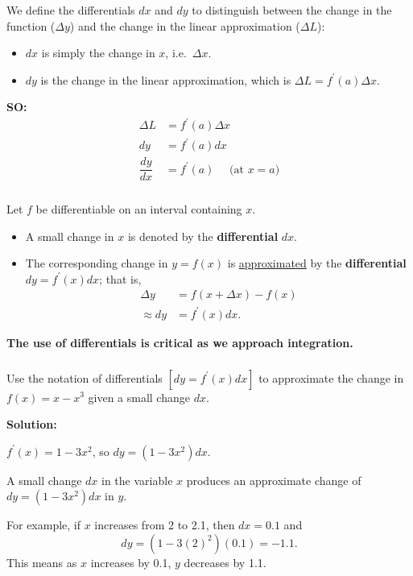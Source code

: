 \documentclass[14pt]{beamer}
\begin{document}
\begin{frame}
\small
We define the differentials $dx$ and $dy$ to distinguish between the \alert{change in the function ($\Delta y$)} and the \alert{change in the linear approximation ($\Delta L$)}: 
\begin{itemize}
\item $dx$ is simply the change in $x$, i.e.\ $\Delta x$.
\item $dy$ is the change in the linear approximation, which is $\Delta L=f^{\prime}(a) \Delta x$.
\end{itemize}

{\bf SO:}
\begin{align*}
\Delta L &= f^{\prime}(a) \Delta x \\[0.5pc]
dy &= f^{\prime}(a) dx \\[0.5pc]
\dfrac{dy}{dx} &= f^{\prime}(a)\quad \text{ (at $x=a$)}
\end{align*}
\end{frame}

\begin{frame}
\frametitle{}
\small
\begin{dfn} Let $f$ be differentiable on an interval containing $x$.
\begin{itemize}
\item A small change in $x$ is denoted by the {\bf differential} $dx$.
\item The corresponding change in $y=f(x)$ is \underline{approximated} by the {\bf differential} $dy=f^{\prime}(x)dx$; that is,
\begin{align*}
\Delta y& = f(x+\Delta x)-f(x) \\[0.5pc]
\approx dy &= f^{\prime}(x)dx.
\end{align*}
\end{itemize}
\end{dfn}

\vspace{1pc}
{\bf The use of differentials is critical as we approach integration.}
\end{frame}

\begin{frame}
\frametitle{}
\small
\begin{ex} Use the notation of differentials $[dy = f^{\prime}(x) dx]$ to approximate the change in $f(x)=x-x^3$ given a small change $dx$. \end{ex}

{\bf Solution:}

$f^{\prime}(x)=1-3x^2$, so $dy=(1-3x^2)dx.$

A small change $dx$ in the variable $x$ produces an approximate change of $dy=(1-3x^2)dx$ in $y$.

\vspace{1.5pc}
For example, if $x$ increases from 2 to 2.1, then $dx=0.1$ and 
\[dy=\left(1-3(2)^2 \right)(0.1)=-1.1.\]
This means as $x$ increases by 0.1, $y$ decreases by 1.1.
\end{frame}
\end{document}
